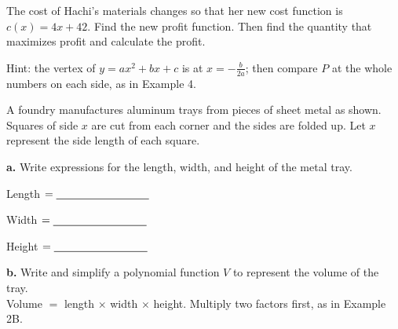\newpage

The cost of Hachi's materials changes so that her new cost function is $c(x)=4x+42$.
Find the new profit function. Then find the quantity that maximizes profit and calculate the profit.

{\small Hint: the vertex of $y=ax^2+bx+c$ is at $x=-\tfrac{b}{2a}$; then compare $P$ at the whole numbers on each side, as in Example 4.}
\lines[5]

A foundry manufactures aluminum trays from pieces of sheet metal as shown. Squares of side $x$ are cut from each corner and the sides are folded up. Let $x$ represent the side length of each square.

\begin{minipage}[t]{0.50\textwidth}
\vspace{0pt}
\textbf{a.} Write expressions for the length, width, and height of the metal tray.

Length $=\blank[3cm]$

Width $=\blank[3cm]$

Height $=\blank[3cm]$
\end{minipage}\hfill
\begin{minipage}[t]{0.46\textwidth}
\vspace{0pt}
\begin{center}
\end{center}
\end{minipage}

\textbf{b.} Write and simplify a polynomial function $V$ to represent the volume of the tray. \\
{\small Volume $=$ length $\times$ width $\times$ height. Multiply two factors first, as in Example 2B.}

